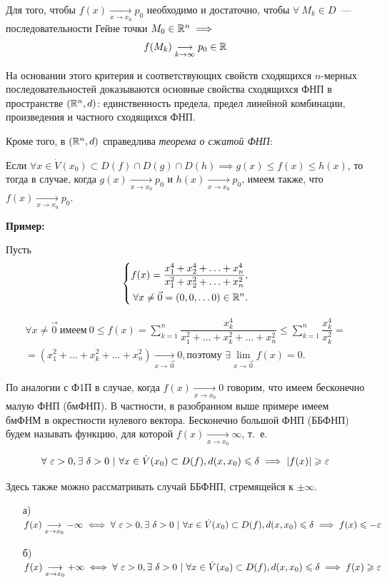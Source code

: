 \documentclass[../../main.tex]{subfiles}
\begin{document}
Для того, чтобы $f(x)\underset{x \to x_0}{\longrightarrow}p_0$
необходимо и достаточно, чтобы
$\forall\ M_k \in D$~--- последовательности Гейне точки 
$M_0 \in \mathbb{R}^n \implies$ 
\[f(M_k)\underset{k \to \infty}
{\longrightarrow}p_0 \in \mathbb{R}\]   

На основании этого критерия и соответствующих свойств сходящихся $n$-мерных
последовательностей доказываются основные свойства сходящихся ФНП
в пространстве $(\mathbb{R}^n, d)$: единственность предела, предел линейной
комбинации, произведения и частного сходящихся ФНП.

Кроме того, в $(\mathbb{R}^n, d)$ справедлива \emph{теорема о сжатой ФНП}:

Если $\forall x \in \dot{V}(x_0) \subset D(f) \cap D(g) \cap D(h) \implies
g(x) \leq f(x) \leq h(x)$, то тогда в случае, когда
$g(x)\underset{x \to x_0}{\longrightarrow}p_0
$ и $h(x)\underset{x \to x_0}{\longrightarrow}p_0$,
имеем также, что $f(x)\underset{x \to x_0}{\longrightarrow}p_0$.

\textbf{Пример:}

Пусть \[ \left\{\begin{aligned}
	f(x) = \dfrac{x_1^4 + x_2^4 + \ldots + x_n^4}{x_1^2 + x_2^2 +
		\ldots + x_n^2}, \\
	\forall x \ne \vec{0} = (0, 0, \ldots 0) \in \mathbb{R}^n.
\end{aligned}\right. \]

\begin{gather*}
	\forall x \ne \vec{0}\ \text{имеем}\ 0 \leq f(x) =
	\displaystyle\sum_{k=1}^{n}{\dfrac{x_k^4}{x_1^2 + \dots + x_k^2 +
			\ldots + x_n^2}} \le
	\displaystyle\sum_{k=1}^{n}{\dfrac{x_k^4}{x_k^2}} = \\ =
	(x_1^2 + \ldots + x_k^2 + \ldots + x_n^2)
	\underset{x \to \vec{0}}{\longrightarrow}0, \text{поэтому }
	\exists\displaystyle\lim_{x \to \vec{0}}f(x) = 0.
\end{gather*}

По аналогии с Ф1П в случае, когда $f(x)\underset{x \to x_0}{\longrightarrow}0$
говорим, что имеем бесконечно малую ФНП (бмФНП). В частности,
в разобранном выше примере имеем бмФНМ в окрестности нулевого вектора.
Бесконечно большой ФНП (ББФНП) будем называть функцию,
для которой $f(x)\underset{x \to x_0}{\longrightarrow}\infty$, т.~е.

\[\forall\ \varepsilon > 0, \exists\ \delta > 0\ |\
\forall x \in \dot{V}(x_0) \subset D(f), d(x, x_0) \leqslant \delta
\implies |f(x)| \geqslant \varepsilon\]

Здесь также можно рассматривать случай ББФНП, стремящейся к $\pm \infty$.
\begin{itemize}
	\item[а)] $f(x)\underset{x \to x_0}{\longrightarrow} -\infty \iff
	\forall\ \varepsilon > 0, \exists\ \delta > 0\ |\
	\forall x \in \dot{V}(x_0) \subset D(f), d(x, x_0) \leqslant \delta
	\implies f(x) \leqslant -\varepsilon$
	\item[б)] $f(x)\underset{x \to x_0}{\longrightarrow} +\infty \iff
	\forall\ \varepsilon > 0, \exists\ \delta > 0\ |\
	\forall x \in \dot{V}(x_0) \subset D(f), d(x, x_0) \leqslant \delta
	\implies f(x) \geqslant \varepsilon$
\end{itemize}
\end{document}
